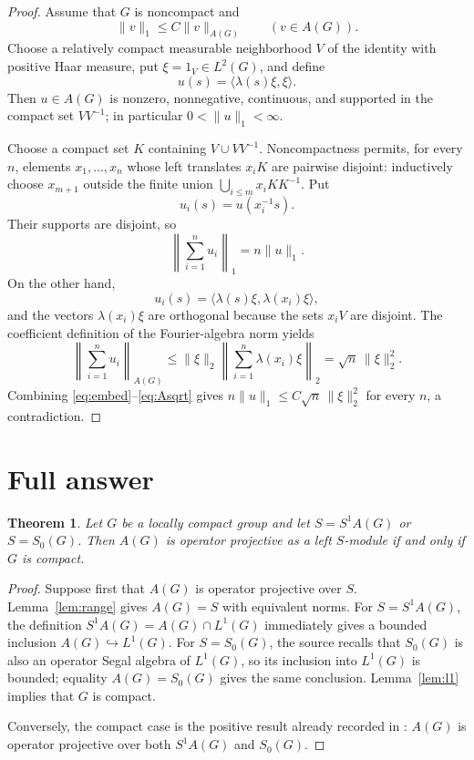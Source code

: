 \documentclass[11pt]{article}
\newtheorem{theorem}{Theorem}
\newcommand{\A}{A(G)}
\newcommand{\Sone}{S^1A(G)}
\newcommand{\Szero}{S_0(G)}
\begin{document}
\begin{proof}
Assume that $G$ is noncompact and
\begin{equation}\label{eq:embed}
 \|v\|_1\le C\|v\|_{\A}\qquad(v\in\A).
\end{equation}
Choose a relatively compact measurable neighborhood $V$ of the identity with positive Haar measure, put $\xi=1_V\in L^2(G)$, and define
\[
 u(s)=\langle\lambda(s)\xi,\xi\rangle.
\]
Then $u\in\A$ is nonzero, nonnegative, continuous, and supported in the compact set $VV^{-1}$; in particular $0<\|u\|_1<\infty$.

Choose a compact set $K$ containing $V\cup VV^{-1}$.  Noncompactness permits, for every $n$, elements $x_1,\ldots,x_n$ whose left translates $x_iK$ are pairwise disjoint: inductively choose $x_{m+1}$ outside the finite union $\bigcup_{i\le m}x_iKK^{-1}$.  Put
\[
 u_i(s)=u(x_i^{-1}s).
\]
Their supports are disjoint, so
\begin{equation}\label{eq:l1linear}
 \left\|\sum_{i=1}^n u_i\right\|_1=n\|u\|_1.
\end{equation}
On the other hand,
\[
 u_i(s)=\langle\lambda(s)\xi,\lambda(x_i)\xi\rangle,
\]
and the vectors $\lambda(x_i)\xi$ are orthogonal because the sets $x_iV$ are disjoint.  The coefficient definition of the Fourier-algebra norm yields
\begin{equation}\label{eq:Asqrt}
 \left\|\sum_{i=1}^n u_i\right\|_{\A}
 \le \|\xi\|_2\left\|\sum_{i=1}^n\lambda(x_i)\xi\right\|_2
 =\sqrt n\,\|\xi\|_2^2.
\end{equation}
Combining \eqref{eq:embed}--\eqref{eq:Asqrt} gives
$n\|u\|_1\le C\sqrt n\,\|\xi\|_2^2$ for every $n$, a contradiction.
\end{proof}

\section*{Full answer}
\begin{theorem}\label{thm:main}
Let $G$ be a locally compact group and let $S=\Sone$ or $S=\Szero$.  Then $\A$ is operator projective as a left $S$-module if and only if $G$ is compact.
\end{theorem}

\begin{proof}
Suppose first that $\A$ is operator projective over $S$.  Lemma~\ref{lem:range} gives $\A=S$ with equivalent norms.  For $S=\Sone$, the definition $\Sone=\A\cap L^1(G)$ immediately gives a bounded inclusion $\A\hookrightarrow L^1(G)$.  For $S=\Szero$, the source recalls that $\Szero$ is also an operator Segal algebra of $L^1(G)$, so its inclusion into $L^1(G)$ is bounded; equality $\A=\Szero$ gives the same conclusion.  Lemma~\ref{lem:l1} implies that $G$ is compact.

Conversely, the compact case is the positive result already recorded in \cite{Source}: $\A$ is operator projective over both $\Sone$ and $\Szero$.
\end{proof}
\end{document}

